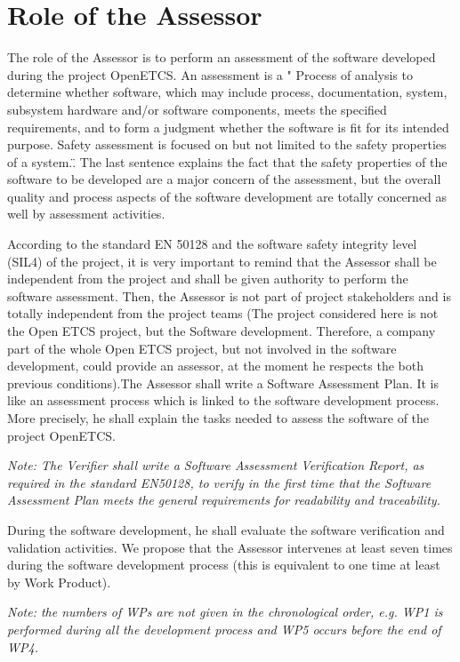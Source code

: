 \documentclass{template/openetcs_report}
\begin{document}
\chapter{Role of the Assessor}

The role of the Assessor is to perform an assessment of the software developed during the project OpenETCS. An assessment is a " Process of analysis to determine whether software, which may include process, documentation, system, subsystem hardware and/or software components, meets the specified requirements, and to form a judgment whether the software is fit for its intended purpose. Safety assessment is focused on but not limited to the safety properties of a system.\".
The last sentence explains the fact that the safety properties of the software to be developed are a major concern of the assessment, but the overall quality and process aspects of the software development are totally concerned as well by assessment activities.

According to the standard EN 50128 and the software safety integrity level (SIL4) of the project, it is very important to remind that the Assessor shall be independent from the project and shall be given authority to perform the software assessment.
Then, the Assessor is not part of project stakeholders and is totally independent from the project teams (The project considered here is not the Open ETCS project, but the Software development. Therefore, a company part of the whole Open ETCS project, but not involved in the software development, could provide an assessor, at the moment he respects the both previous conditions).The Assessor shall write a Software Assessment Plan. It is like an assessment process which is linked to the software development process.
More precisely, he shall explain the tasks needed to assess the software of the project OpenETCS.

{\itshape 
Note: The Verifier shall write a Software Assessment Verification Report, as required in the standard EN50128, to verify in the first time that the Software Assessment Plan meets the general requirements for readability and traceability.
}

During the software development, he shall evaluate the software verification and validation activities.
We propose that the Assessor intervenes at least seven times during the software development process (this is equivalent to one time at least by Work Product).

\textit{
Note: the numbers of WPs are not given in the chronological order, e.g. WP1 is performed during all the development process and WP5 occurs before the end of WP4.
}
\end{document}
